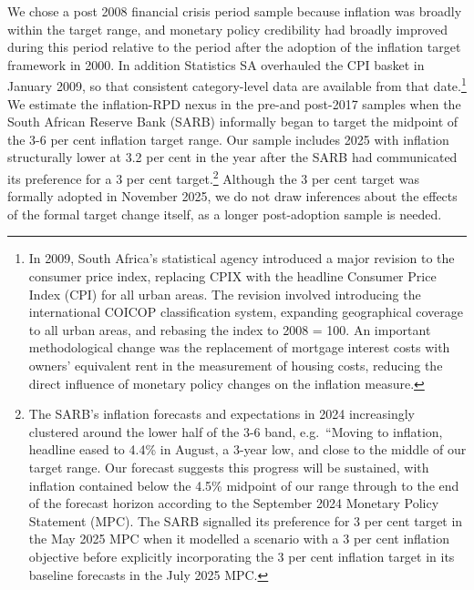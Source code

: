 \documentclass[
  letterpaper,
  DIV=11,
  numbers=noendperiod]{scrartcl}
\begin{document}
We chose a post 2008 financial crisis period sample because inflation
was broadly within the target range, and monetary policy credibility had
broadly improved during this period relative to the period after the
adoption of the inflation target framework in 2000. In addition
Statistics SA overhauled the CPI basket in January 2009, so that
consistent category-level data are available from that date.\footnote{In
  2009, South Africa's statistical agency introduced a major revision to
  the consumer price index, replacing CPIX with the headline Consumer
  Price Index (CPI) for all urban areas. The revision involved
  introducing the international COICOP classification system, expanding
  geographical coverage to all urban areas, and rebasing the index to
  2008 = 100. An important methodological change was the replacement of
  mortgage interest costs with owners' equivalent rent in the
  measurement of housing costs, reducing the direct influence of
  monetary policy changes on the inflation measure.} We estimate the
inflation-RPD nexus in the pre-and post-2017 samples when the South
African Reserve Bank (SARB) informally began to target the midpoint of
the 3-6 per cent inflation target range. Our sample includes 2025 with
inflation structurally lower at 3.2 per cent in the year after the SARB
had communicated its preference for a 3 per cent target.\footnote{The
  SARB's inflation forecasts and expectations in 2024 increasingly
  clustered around the lower half of the 3-6 band, e.g.~``Moving to
  inflation, headline eased to 4.4\% in August, a 3-year low, and close
  to the middle of our target range. Our forecast suggests this progress
  will be sustained, with inflation contained below the 4.5\% midpoint
  of our range through to the end of the forecast horizon according to
  the September 2024 Monetary Policy Statement (MPC). The SARB signalled
  its preference for 3 per cent target in the May 2025 MPC when it
  modelled a scenario with a 3 per cent inflation objective before
  explicitly incorporating the 3 per cent inflation target in its
  baseline forecasts in the July 2025 MPC.} Although the 3 per cent
target was formally adopted in November 2025, we do not draw inferences
about the effects of the formal target change itself, as a longer
post-adoption sample is needed.
\end{document}

